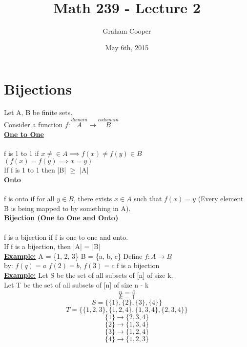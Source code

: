 \documentclass[12pt]{article}
\title{\vspace{-15ex}Math 239 - Lecture 2\vspace{-1ex}}
\date{May 6th, 2015}
\author{Graham Cooper}
\newcommand{\myt}[1]{\textbf{\underline{#1}}}
\begin{document}
	\maketitle
	\section*{Bijections}
	Let A, B be finite sets.\\
	Consider a function $f: \overset{domain}{A} \rightarrow \overset{codomain}{B}$\\
	
	\myt{One to One}\\\\
	f is 1 to 1 if $x \neq \in A \implies f(x) \neq f(y) \in B$\\
	$(f(x) = f(y) \implies x = y )$\\
	
	
	If f is 1 to 1 then |B| $\geq$ |A|\\
	
	\myt{Onto}\\\\
	f is \underline{onto} if for all $y \in B$, there exists $x \in A$ such that $f(x) = y$ (Every element B is being mapped to by something in A).\\
	
	
	\myt{Bijection (One to One and Onto)}\\\\
	f is a bijection if f is one to one and onto.\\
	If f is a bijection, then |A| = |B|\\
	
	
	\myt{Example:} A = \{1, 2, 3\} B = \{a, b, c\} Define $f: A \rightarrow B$\\
	by: $f(q) = a$ $f(2) = b$, $f(3) = c$ f is a bijection\\
	
	\myt{Example:} Let S be the set of all subsets of [n] of size k.\\
	Let T be the set of all subsets of [n] of size n - k\\
	
	$$n = 4$$
	$$k = 1$$
	$$S = \{\{1\}, \{2\}, \{3\}, \{4\} \}$$
	$$T = \{\{1,2,3\},\{1,2,4\},\{1,3,4\},\{2,3,4\}\}$$
	$$\{1\} \rightarrow \{2,3,4\}$$
	$$\{2\} \rightarrow \{1,3,4\}$$
	$$\{3\} \rightarrow \{1,2,4\}$$
	$$\{4\} \rightarrow \{1,2,3\}$$\\
	
\end{document}

